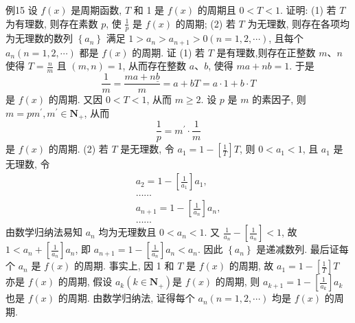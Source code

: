 例15 设 $f(x)$ 是周期函数, $T$ 和 1 是 $f(x)$ 的周期且 $0<T<1$. 证明:
(1) 若 $T$ 为有理数, 则存在素数 $p$, 使 $\frac{1}{p}$ 是 $f(x)$ 的周期;
(2) 若 $T$ 为无理数, 则存在各项均为无理数的数列 $\left\{a_n\right\}$ 满足 $1>a_n> a_{n+1}>0(n=1,2, \cdots)$, 且每个 $a_n(n=1,2, \cdots)$ 都是 $f(x)$ 的周期.
证 (1) 若 $T$ 是有理数,则存在正整数 $m 、 n$ 使得 $T=\frac{n}{m}$ 且 $(m, n)=1$, 从而存在整数 $a 、 b$, 使得 $m a+n b=1$. 于是
$$
\frac{1}{m}=\frac{m a+n \underline{b}}{m}=a+b T=a \cdot 1+b \cdot T
$$
是 $f(x)$ 的周期.
又因 $0<T<1$, 从而 $m \geqslant 2$. 设 $p$ 是 $m$ 的素因子, 则 $m=p m^{\prime}, m^{\prime} \in \mathbf{N}_{+}$, 从而
$$
\frac{1}{p}=m^{\prime} \cdot \frac{1}{m}
$$
是 $f(x)$ 的周期.
(2) 若 $T$ 是无理数, 令 $a_1=1-\left[\frac{1}{T}\right] T$, 则 $0<a_1<1$, 且 $a_1$ 是无理数,
令
$$
\begin{gathered}
a_2=1-\left[\frac{1}{a_1}\right] a_1, \\
\ldots \ldots \\
a_{n+1}=1-\left[\frac{1}{a_n}\right] a_n, \\
\ldots \ldots
\end{gathered}
$$
由数学归纳法易知 $a_n$ 均为无理数且 $0<a_n<1$. 又 $\frac{1}{a_n}-\left[\frac{1}{a_n}\right]<1$, 故 $1<a_n+\left[\frac{1}{a_n}\right] a_n$, 即 $a_{n+1}=1-\left[\frac{1}{a_n}\right] a_n<a_n$. 因此 $\left\{a_n\right\}$ 是递减数列.
最后证每个 $a_n$ 是 $f(x)$ 的周期.
事实上, 因 1 和 $T$ 是 $f(x)$ 的周期, 故 $a_1=1-\left[\frac{1}{T}\right] T$ 亦是 $f(x)$ 的周期, 假设 $a_k\left(k \in \mathbf{N}_{+}\right)$是 $f(x)$ 的周期, 则 $a_{k+1}= 1-\left[\frac{1}{a_k}\right] a_k$ 也是 $f(x)$ 的周期.
由数学归纳法, 证得每个 $a_n(n=1,2, \cdots)$ 均是 $f(x)$ 的周期.


